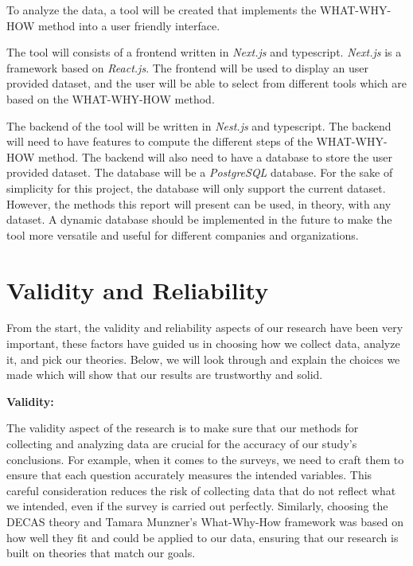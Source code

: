 
To analyze the data, a tool will be created that implements the WHAT-WHY-HOW method into a user friendly interface. 

The tool will consists of a frontend written in \textit{Next.js} and typescript. \textit{Next.js} is a framework based on \textit{React.js}. The frontend will be used to display an user provided dataset, and the user will be able to select from different tools which are based on the WHAT-WHY-HOW method.

The backend of the tool will be written in \textit{Nest.js} and typescript. The backend will need to have features to compute the different steps of the WHAT-WHY-HOW method. The backend will also need to have a database to store the user provided dataset. The database will be a \textit{PostgreSQL} database. For the sake of simplicity for this project, the database will only support the current 
dataset. However, the methods this report will present can be used, in theory, with any dataset. A dynamic database should be implemented in the future to make the tool more versatile and useful for 
different companies and organizations.

\section{Validity and Reliability}
From the start, the validity and reliability aspects of our research have been very important, these factors have guided us in choosing how we collect data, analyze it, and pick our theories. Below, we will look through and explain the choices we made which will show that our results are trustworthy and solid.  

\textbf{Validity:}

The validity aspect of the research is to make sure that our methods for collecting and analyzing data are crucial for the accuracy of our study’s conclusions.  For example, when it comes to the surveys, we need to craft them to ensure that each question accurately measures the intended variables. This careful consideration reduces the risk of collecting data that do not reflect what we intended, even if the survey is carried out perfectly. Similarly, choosing the DECAS theory and Tamara Munzner's What-Why-How framework was based on how well they fit and could be applied to our data, ensuring that our research is built on theories that match our goals.

